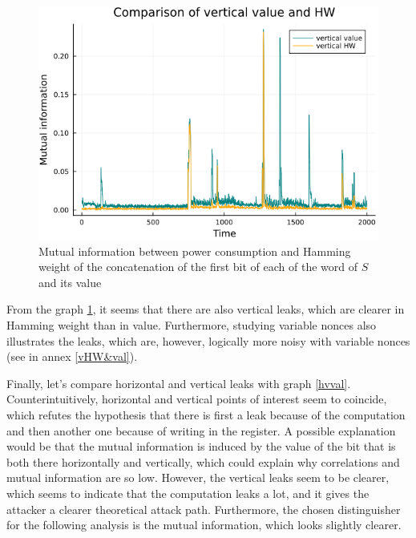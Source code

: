 \documentclass[11pt,technote]{IEEEtran}
\begin{document}
		\begin{figure}[h!]
			\centering
			\includegraphics[scale=0.4]{img_files/vertical_one_bit}
			\caption{Mutual information between power consumption and Hamming weight of the concatenation of the first bit of each of the word of $S$ and its value}
			\label{vHW}
		\end{figure}
		
		From the graph \ref{vHW}, it seems that there are also vertical leaks, which are clearer in Hamming weight than in value. Furthermore, studying variable nonces also illustrates the leaks, which are, however, logically more noisy with variable nonces (see in annex \ref{vHW&val}).
		
		Finally, let's compare horizontal and vertical leaks with graph \ref{hvval}. Counterintuitively, horizontal and vertical points of interest seem to coincide, which refutes the hypothesis that there is first a leak because of the computation and then another one because of writing in the register. A possible explanation would be that the mutual information is induced by the value of the bit that is both there horizontally and vertically, which could explain why correlations and mutual information are so low. However, the vertical leaks seem to be clearer, which seems to indicate that the computation leaks a lot, and it gives the attacker a clearer theoretical attack path. Furthermore, the chosen distinguisher for the following analysis is the mutual information, which looks slightly clearer.
		
\end{document}
